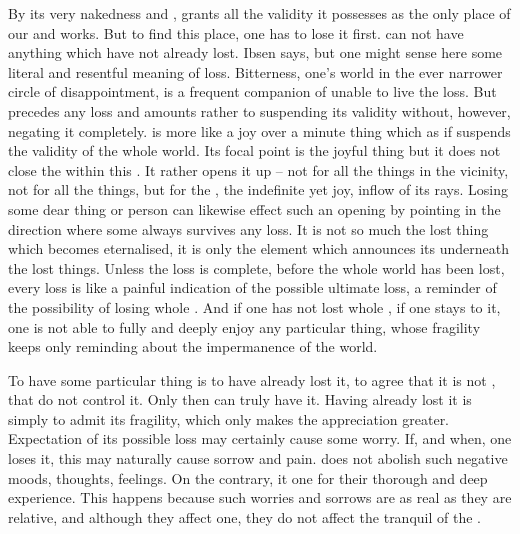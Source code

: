 \pa By its very nakedness and ,  grants
 all the validity it possesses as the only place of our 
and works.  But to find this place, one has to lose it first.   can not
have anything which  have not already lost.  Ibsen says,  but one might
sense here some literal and resentful meaning of loss.  Bitterness, 
one's world in the ever narrower circle of disappointment, is a frequent
companion of  unable to live the  loss.  But
 precedes any  loss and amounts rather to suspending
its validity without, however, negating it completely.  is more
like a joy over a minute thing which as if suspends the validity of the whole
world. Its focal point is the  joyful thing but it does not close the
 within this \herenow. It rather opens it up -- not for all the
things in the vicinity, not for all the  things, but for the
, the indefinite yet  joy, inflow of its rays.  Losing some
dear thing or person can likewise effect such an opening by pointing in the
direction  where some  always survives any  loss.
It is not so much the lost thing which becomes eternalised, it is only the
 element which announces its  underneath the lost
things.  Unless
the loss is complete, before the whole world has been lost, every 
loss is like a painful indication of the possible ultimate loss, a reminder of
the possibility of losing  whole .  And if one has not lost  whole , if
one stays  to it, one is not able to fully and deeply enjoy any
particular thing, whose fragility keeps only reminding about the impermanence of
the world.

To have some particular thing is to have already lost it, to agree that it is
not , that  do not control it. Only then can  truly have
it.  Having already lost it is simply to admit its
fragility, which only makes the appreciation greater.  Expectation of its
possible loss may certainly cause some worry.  If, and when, one 
loses it, this may naturally cause sorrow and pain.   does not
abolish such negative moods, thoughts, feelings. On the contrary, it 
one for their thorough and deep experience. This happens because such worries
and sorrows are as real as they are relative, and although they affect one,
they do not affect the tranquil  of the .

